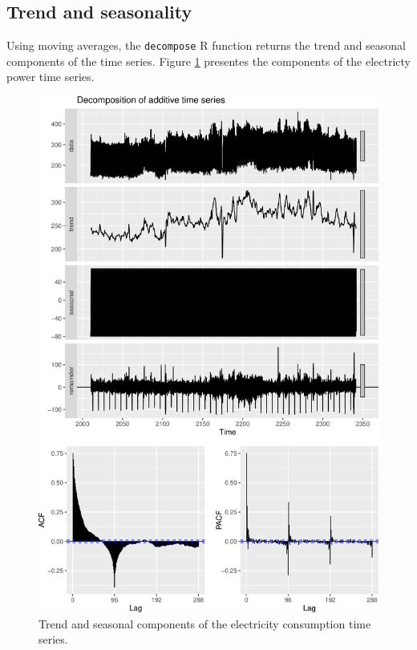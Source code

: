 \subsection{Trend and seasonality}
Using moving averages, the \texttt{decompose} R function returns the trend and seasonal components 
of the time series. Figure \ref{figure_decompose} presentes the components of the electricty power 
time series. 

\begin{figure}[H]
\centering
 \includegraphics[scale=0.45]{figures/decompose.png}
\caption{Trend and seasonal components of the electricity consumption time series.}
\label{figure_decompose}
\end{figure}


